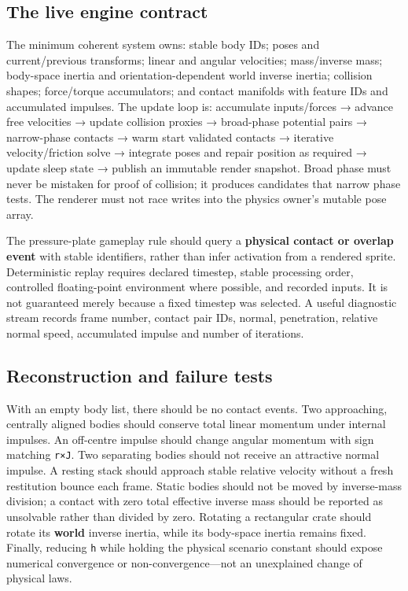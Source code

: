 \subsection{The live engine contract}\label{the-live-engine-contract}

The minimum coherent system owns: stable body IDs; poses and current/previous transforms; linear and angular velocities; mass/inverse mass; body-space inertia and orientation-dependent world inverse inertia; collision shapes; force/torque accumulators; and contact manifolds with feature IDs and accumulated impulses. The update loop is: accumulate inputs/forces → advance free velocities → update collision proxies → broad-phase potential pairs → narrow-phase contacts → warm start validated contacts → iterative velocity/friction solve → integrate poses and repair position as required → update sleep state → publish an immutable render snapshot. Broad phase must never be mistaken for proof of collision; it produces candidates that narrow phase tests. The renderer must not race writes into the physics owner's mutable pose array.

The pressure-plate gameplay rule should query a \textbf{physical contact or overlap event} with stable identifiers, rather than infer activation from a rendered sprite. Deterministic replay requires declared timestep, stable processing order, controlled floating-point environment where possible, and recorded inputs. It is not guaranteed merely because a fixed timestep was selected. A useful diagnostic stream records frame number, contact pair IDs, normal, penetration, relative normal speed, accumulated impulse and number of iterations.

\subsection{Reconstruction and failure tests}\label{reconstruction-and-failure-tests}

With an empty body list, there should be no contact events. Two approaching, centrally aligned bodies should conserve total linear momentum under internal impulses. An off-centre impulse should change angular momentum with sign matching \texttt{r×J}. Two separating bodies should not receive an attractive normal impulse. A resting stack should approach stable relative velocity without a fresh restitution bounce each frame. Static bodies should not be moved by inverse-mass division; a contact with zero total effective inverse mass should be reported as unsolvable rather than divided by zero. Rotating a rectangular crate should rotate its \textbf{world} inverse inertia, while its body-space inertia remains fixed. Finally, reducing \texttt{h} while holding the physical scenario constant should expose numerical convergence or non-convergence---not an unexplained change of physical laws.

